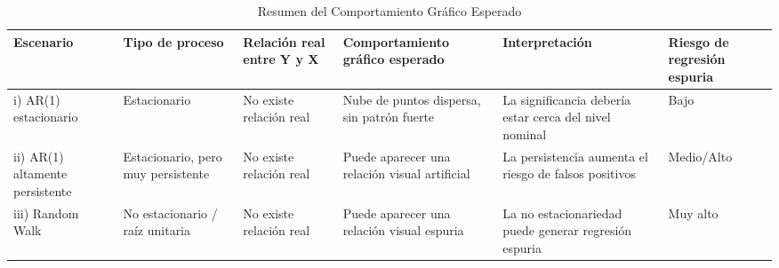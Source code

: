 \begin{table}
\caption{Resumen del Comportamiento Gráfico Esperado}
\label{tab:resumen_graficos}
\begin{tabular}{llllll}
\toprule
Escenario & Tipo de proceso & Relación real entre Y y X & Comportamiento gráfico esperado & Interpretación & Riesgo de regresión espuria \\
\midrule
i) AR(1) estacionario & Estacionario & No existe relación real & Nube de puntos dispersa, sin patrón fuerte & La significancia debería estar cerca del nivel nominal & Bajo \\
ii) AR(1) altamente persistente & Estacionario, pero muy persistente & No existe relación real & Puede aparecer una relación visual artificial & La persistencia aumenta el riesgo de falsos positivos & Medio/Alto \\
iii) Random Walk & No estacionario / raíz unitaria & No existe relación real & Puede aparecer una relación visual espuria & La no estacionariedad puede generar regresión espuria & Muy alto \\
\bottomrule
\end{tabular}
\end{table}
